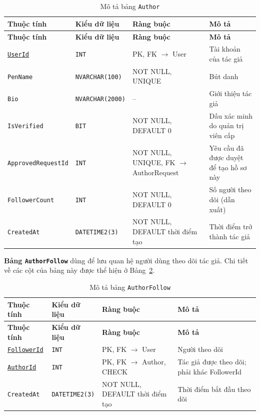 {\small
\renewcommand{\arraystretch}{1.2}
\begin{longtable}{|>{\raggedright\arraybackslash}p{3.1cm}|>{\raggedright\arraybackslash}p{2.7cm}|>{\raggedright\arraybackslash}p{4.0cm}|>{\raggedright\arraybackslash}p{5.4cm}|}
\caption{Mô tả bảng \texttt{Author}}\label{tab:db-author}\\
\hline
\textbf{Thuộc tính} & \textbf{Kiểu dữ liệu} & \textbf{Ràng buộc} & \textbf{Mô tả} \\ \hline
\endfirsthead
\hline
\textbf{Thuộc tính} & \textbf{Kiểu dữ liệu} & \textbf{Ràng buộc} & \textbf{Mô tả} \\ \hline
\endhead
\underline{\texttt{UserId}} & \texttt{INT} & PK, FK $\rightarrow$ User & Tài khoản của tác giả \\ \hline
\texttt{PenName} & \texttt{NVARCHAR(100)} & NOT NULL, UNIQUE & Bút danh \\ \hline
\texttt{Bio} & \texttt{NVARCHAR(2000)} & -- & Giới thiệu tác giả \\ \hline
\texttt{IsVerified} & \texttt{BIT} & NOT NULL, DEFAULT 0 & Dấu xác minh do quản trị viên cấp \\ \hline
\texttt{ApprovedRequestId} & \texttt{INT} & NOT NULL, UNIQUE, FK $\rightarrow$ AuthorRequest & Yêu cầu đã được duyệt để tạo hồ sơ này \\ \hline
\texttt{FollowerCount} & \texttt{INT} & NOT NULL, DEFAULT 0 & Số người theo dõi (dẫn xuất) \\ \hline
\texttt{CreatedAt} & \texttt{DATETIME2(3)} & NOT NULL, DEFAULT thời điểm tạo & Thời điểm trở thành tác giả \\ \hline
\end{longtable}
}

\textbf{Bảng \texttt{AuthorFollow}} dùng để lưu quan hệ người dùng theo dõi tác giả. Chi tiết về các cột của bảng này được thể hiện ở Bảng~\ref{tab:db-author-follow}.


{\small
\renewcommand{\arraystretch}{1.2}
\begin{longtable}{|>{\raggedright\arraybackslash}p{3.1cm}|>{\raggedright\arraybackslash}p{2.7cm}|>{\raggedright\arraybackslash}p{4.0cm}|>{\raggedright\arraybackslash}p{5.4cm}|}
\caption{Mô tả bảng \texttt{AuthorFollow}}\label{tab:db-author-follow}\\
\hline
\textbf{Thuộc tính} & \textbf{Kiểu dữ liệu} & \textbf{Ràng buộc} & \textbf{Mô tả} \\ \hline
\endfirsthead
\hline
\textbf{Thuộc tính} & \textbf{Kiểu dữ liệu} & \textbf{Ràng buộc} & \textbf{Mô tả} \\ \hline
\endhead
\underline{\texttt{FollowerId}} & \texttt{INT} & PK, FK $\rightarrow$ User & Người theo dõi \\ \hline
\underline{\texttt{AuthorId}} & \texttt{INT} & PK, FK $\rightarrow$ Author, CHECK & Tác giả được theo dõi; phải khác FollowerId \\ \hline
\texttt{CreatedAt} & \texttt{DATETIME2(3)} & NOT NULL, DEFAULT thời điểm tạo & Thời điểm bắt đầu theo dõi \\ \hline
\end{longtable}
}


